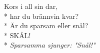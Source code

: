 \begin{SongText}[Hyfsvisa]
    \begin{SongVerse}
        Kors i all sin dar,\\*%
        har du brännvin kvar?\\*%
        Är du sparsam eller snål?\\*%
        SKÅL!\\*%
        \emph{Sparsamma sjunger: "Snål!"}
    \end{SongVerse}
\end{SongText}
